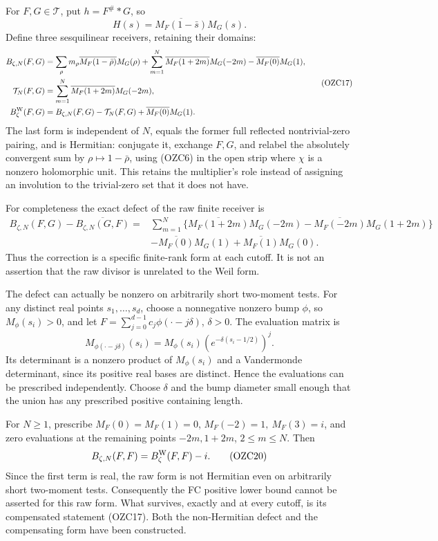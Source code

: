 \documentclass[
  10pt,
  a4paper,
]{article}
\begin{document}
For \(F,G\in\mathcal T\), put \(h=F^\#*G\), so \[
H(s)=\overline{M_F(1-\bar s)}M_G(s).
\] Define three sesquilinear receivers, retaining their domains: \[
\begin{aligned}
B_{\zeta,N}(F,G)
 &=\sum_\rho m_\rho\overline{M_F(1-\bar\rho)}M_G(\rho)
   +\sum_{m=1}^N\overline{M_F(1+2m)}M_G(-2m)
   -\overline{M_F(0)}M_G(1),\\
\mathcal T_N(F,G)
 &=\sum_{m=1}^N\overline{M_F(1+2m)}M_G(-2m),\\
B_\zeta^{\rm W}(F,G)
 &=B_{\zeta,N}(F,G)-\mathcal T_N(F,G)
    +\overline{M_F(0)}M_G(1).
\end{aligned}
\tag{OZC17}
\] The last form is independent of \(N\), equals the former full
reflected nontrivial-zero pairing, and is Hermitian: conjugate it,
exchange \(F,G\), and relabel the absolutely convergent sum by
\(\rho\mapsto1-\bar\rho\), using (OZC6) in the open strip where \(\chi\)
is a nonzero holomorphic unit. This retains the multiplier's role
instead of assigning an involution to the trivial-zero set that it does
not have.

For completeness the exact defect of the raw finite receiver is \[
\begin{aligned}
B_{\zeta,N}(F,G)-\overline{B_{\zeta,N}(G,F)}
={}&\sum_{m=1}^N
 \{\overline{M_F(1+2m)}M_G(-2m)
 -\overline{M_F(-2m)}M_G(1+2m)\}\\
&-\overline{M_F(0)}M_G(1)
 +\overline{M_F(1)}M_G(0).
\end{aligned}
\tag{OZC18}
\] Thus the correction is a specific finite-rank form at each cutoff. It
is not an assertion that the raw divisor is unrelated to the Weil form.

The defect can actually be nonzero on arbitrarily short two-moment
tests. For any distinct real points \(s_1,\ldots,s_d\), choose a
nonnegative nonzero bump \(\phi\), so \(M_\phi(s_i)>0\), and let
\(F=\sum_{j=0}^{d-1}c_j\phi(\cdot-j\delta)\), \(\delta>0\). The
evaluation matrix is \[
M_{\phi(\cdot-j\delta)}(s_i)
=M_\phi(s_i)\left(e^{-\delta(s_i-1/2)}\right)^j.
\tag{OZC19}
\] Its determinant is a nonzero product of \(M_\phi(s_i)\) and a
Vandermonde determinant, since its positive real bases are distinct.
Hence the evaluations can be prescribed independently. Choose \(\delta\)
and the bump diameter small enough that the union has any prescribed
positive containing length.

For \(N\ge1\), prescribe \(M_F(0)=M_F(1)=0\), \(M_F(-2)=1,\ M_F(3)=i\),
and zero evaluations at the remaining points \(-2m,1+2m\),
\(2\le m\le N\). Then \[
B_{\zeta,N}(F,F)=B_\zeta^{\rm W}(F,F)-i.
\tag{OZC20}
\] Since the first term is real, the raw form is not Hermitian even on
arbitrarily short two-moment tests. Consequently the FC positive lower
bound cannot be asserted for this raw form. What survives, exactly and
at every cutoff, is its compensated statement (OZC17). Both the
non-Hermitian defect and the compensating form have been constructed.
\end{document}
